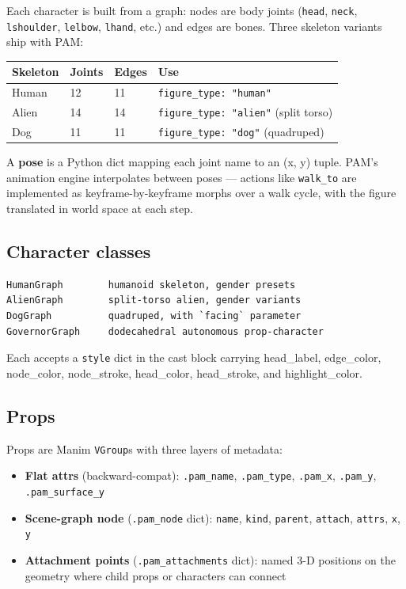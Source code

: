 \documentclass[
  12pt,
  letterpaper,
]{book}
\providecommand{\tightlist}{%
  \setlength{\itemsep}{0pt}\setlength{\parskip}{0pt}}
\begin{document}
Each character is built from a graph: nodes are body joints
(\texttt{head}, \texttt{neck}, \texttt{lshoulder}, \texttt{lelbow},
\texttt{lhand}, etc.) and edges are bones. Three skeleton variants ship
with PAM:

\begin{longtable}[]{@{}llll@{}}
\toprule\noalign{}
Skeleton & Joints & Edges & Use \\
\midrule\noalign{}
\endhead
\bottomrule\noalign{}
\endlastfoot
Human & 12 & 11 & \texttt{figure\_type:\ "human"} \\
Alien & 14 & 14 & \texttt{figure\_type:\ "alien"} (split torso) \\
Dog & 11 & 11 & \texttt{figure\_type:\ "dog"} (quadruped) \\
\end{longtable}

A \textbf{pose} is a Python dict mapping each joint name to an (x, y)
tuple. PAM's animation engine interpolates between poses --- actions
like \texttt{walk\_to} are implemented as keyframe-by-keyframe morphs
over a walk cycle, with the figure translated in world space at each
step.

\subsection{Character classes}\label{character-classes}

\begin{verbatim}
HumanGraph        humanoid skeleton, gender presets
AlienGraph        split-torso alien, gender variants
DogGraph          quadruped, with `facing` parameter
GovernorGraph     dodecahedral autonomous prop-character
\end{verbatim}

Each accepts a \texttt{style} dict in the cast block carrying
head\_label, edge\_color, node\_color, node\_stroke, head\_color,
head\_stroke, and highlight\_color.

\subsection{Props}\label{props}

Props are Manim \texttt{VGroup}s with three layers of metadata:

\begin{itemize}
\tightlist
\item
  \textbf{Flat attrs} (backward-compat): \texttt{.pam\_name},
  \texttt{.pam\_type}, \texttt{.pam\_x}, \texttt{.pam\_y},
  \texttt{.pam\_surface\_y}
\item
  \textbf{Scene-graph node} (\texttt{.pam\_node} dict): \texttt{name},
  \texttt{kind}, \texttt{parent}, \texttt{attach}, \texttt{attrs},
  \texttt{x}, \texttt{y}
\item
  \textbf{Attachment points} (\texttt{.pam\_attachments} dict): named
  3-D positions on the geometry where child props or characters can
  connect
\end{itemize}
\end{document}

